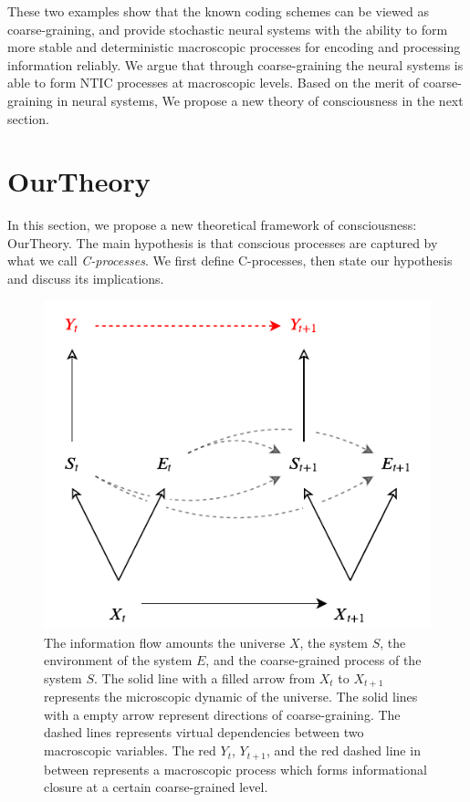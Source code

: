 \documentclass[utf8]{article}
\begin{document}
        These two examples show that the known coding schemes can be viewed as coarse-graining, and provide stochastic neural systems with the ability to form more stable and deterministic macroscopic processes for encoding and processing information reliably. We argue that through coarse-graining the neural systems is able to form NTIC processes at macroscopic levels. Based on the merit of coarse-graining in neural systems, We propose a new theory of consciousness in the next section. 



	\section{\acf{OurTheory}}\label{sec:OurTheory}
	
        In this section, we propose a new theoretical framework of consciousness: \acf{OurTheory}. The main hypothesis is that conscious processes are captured by what we call \textit{C-processes}. We first define C-processes, then state our hypothesis and discuss its implications.
        
        
		\begin{figure}[H]
		    \centering
			\includegraphics[width=\textwidth]{WritingMaterials/Fig_FullGraph/FullGraph.pdf}
			\caption{The information flow amounts the universe $X$, the system $S$, the environment of the system $E$, and the coarse-grained process of the system $S$. The solid line with a filled arrow from $X_t$ to $X_{t+1}$ represents the microscopic dynamic of the universe. The solid lines with a empty arrow represent directions of coarse-graining. The dashed lines represents virtual dependencies between  two macroscopic variables. The red $Y_t$, $Y_{t+1}$, and the red dashed line in between represents a macroscopic process which forms informational closure at a certain coarse-grained level.}
			\label{fig:fullgraph}
	   	\end{figure}
\end{document}
